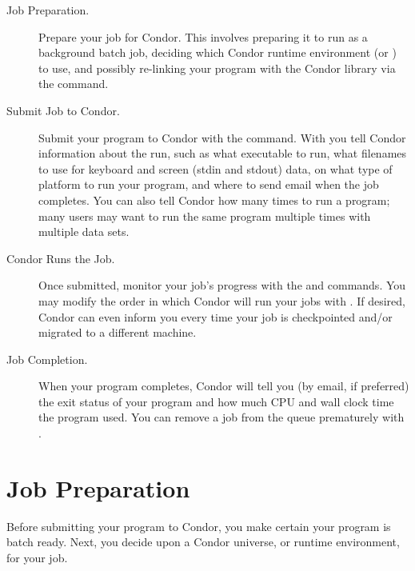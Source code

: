 \begin{description}

\item[Job Preparation.]Prepare your job for
Condor. This involves preparing it to run as a background batch job,
deciding which Condor runtime environment (or ) to use,
and possibly re-linking your program with the Condor library via the
 command. 

\item[Submit Job to Condor.]Submit your program to Condor with
the  command.
With  you tell Condor
information about the run, such as what executable to run, what
filenames to use for keyboard and screen (stdin and stdout) data,
on what type of platform to run your program, and
where to send email when the job completes. You can also tell Condor how
many times to run a program; many users may want to run the same program
multiple times with multiple data sets.

\item[Condor Runs the Job.]Once submitted, monitor your job's
progress with the 
and  commands.
You may modify the order in which Condor will run your jobs with
. If desired, Condor can even inform you every time your job
is checkpointed and/or migrated to a different machine. 

\item[Job Completion.]When your program completes, Condor will tell you
(by email, if preferred) the exit status of your program and how much
CPU and wall clock time the program used. You can remove a job from the
queue prematurely with . 

\end{description}  %


\section{\label{sec:job-preparation}Job Preparation}

Before submitting your program to Condor, you make certain
your program is batch ready.  Next, you decide upon a Condor
universe, or runtime environment, for your job.

